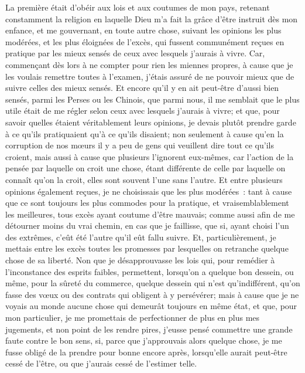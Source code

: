 \documentclass[french,twoside]{book} %
\begin{document}
La première était d'obéir aux lois et aux coutumes de mon pays, retenant constamment la religion en laquelle Dieu m'a fait la grâce d'être instruit dès mon enfance, et me gouvernant, en toute autre chose, suivant les opinions les plus modérées, et les plus éloignées de l'excès, qui fussent communément reçues en pratique par les mieux sensés de ceux avec lesquels j'aurais à vivre. Car, commençant dès lors à ne compter pour rien les miennes propres, à cause que je les voulais remettre toutes à l'examen, j'étais assuré de ne pouvoir mieux que de suivre celles des mieux sensés. Et encore qu'il y en ait peut-être d'aussi bien sensés, parmi les Perses ou les Chinois, que parmi nous, il me semblait que le plus utile était de me régler selon ceux avec lesquels j'aurais à vivre; et que, pour savoir quelles étaient véritablement leurs opinions, je devais plutôt prendre garde à ce qu'ils pratiquaient qu'à ce qu'ils disaient; non seulement à cause qu'en la corruption de nos mœurs il y a peu de gens qui veuillent dire tout ce qu'ils croient, mais aussi à cause que plusieurs l'ignorent eux-mêmes, car l'action de la pensée par laquelle on croit une chose, étant différente de celle par laquelle on connaît qu'on la croit, elles sont souvent l'une sans l'autre. Et entre plusieurs opinions également reçues, je ne choisissais que les plus modérées : tant à cause que ce sont toujours les plus commodes pour la pratique, et vraisemblablement les meilleures, tous excès ayant coutume d'être mauvais; comme aussi afin de me détourner moins du vrai chemin, en cas que je faillisse, que si, ayant choisi l'un des extrêmes, c'eût été l'autre qu'il eût fallu suivre. Et, particulièrement, je mettais entre les excès toutes les promesses par lesquelles on retranche quelque chose de sa liberté. Non que je désapprouvasse les lois qui, pour remédier à l'inconstance des esprits faibles, permettent, lorsqu'on a quelque bon dessein, ou même, pour la sûreté du commerce, quelque dessein qui n'est qu'indifférent, qu'on fasse des vœux ou des contrats qui obligent à y persévérer; mais à cause que je ne voyais au monde aucune chose qui demeurât toujours en même état, et que, pour mon particulier, je me promettais de perfectionner de plus en plus mes jugements, et non point de les rendre pires, j'eusse pensé commettre une grande faute contre le bon sens, si, parce que j'approuvais alors quelque chose, je me fusse obligé de la prendre pour bonne encore après, lorsqu'elle aurait peut-être cessé de l'être, ou que j'aurais cessé de l'estimer telle.\par
\end{document}
